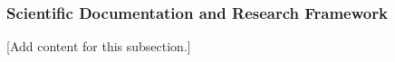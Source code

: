 
\subsubsection{Scientific Documentation and Research Framework}
\label{subsubsec:design_2_6_1_scientific_documentation_framework}

[Add content for this subsection.]
